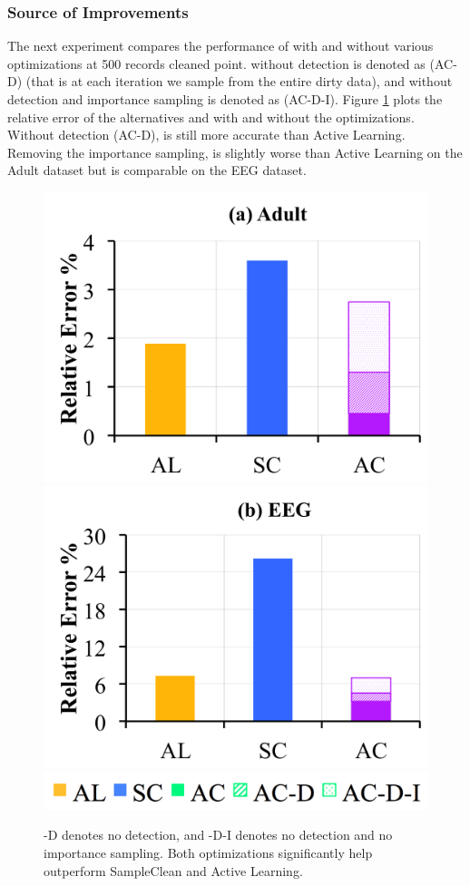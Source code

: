 \subsubsection{Source of Improvements}\label{comp}
The next experiment compares the performance of \sys with and without various optimizations at 500 records cleaned point. 
\sys without detection is denoted as (AC-D) (that is at each iteration we sample from the entire dirty data), and \sys without detection and importance sampling is denoted as (AC-D-I).
Figure \ref{opts} plots the relative error of the alternatives and \sys with and without the optimizations.
Without detection (AC-D), \sys is still more accurate than Active Learning.
Removing the importance sampling, \sys is slightly worse than Active Learning on the Adult dataset but is comparable on the EEG dataset.

\begin{figure}[t]\vspace{0.5em}
\centering
 \includegraphics[width=0.49\columnwidth]{exp/exp8a.png}
 \includegraphics[width=0.49\columnwidth]{exp/exp8b.png}
 \includegraphics[width=0.5\columnwidth]{exp/legend-8.png}\vspace{-1em}
 \caption{ -D denotes no detection, and -D-I denotes no detection and no importance sampling. Both optimizations significantly help \sys outperform SampleClean and Active Learning. \label{opts}}\vspace{-1.5em}
\end{figure}

